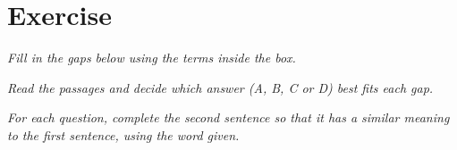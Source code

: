 \documentclass{article}
\begin{document}
\newpage
\section{Exercise}

\noindent \textit{Fill in the gaps below using the terms inside the box.}

%
%
%
%
%
%
%
%
%
%
%
%
%
%
%
%
%
%
%
%

\noindent \textit{Read the passages and decide which answer (A, B, C or D) best fits each gap.}

%
%
%
%
%
%
%
%
%
%
%
%
%
%
%
%
%
%
%
%

\noindent \textit{For each question, complete the second sentence so that it has a similar meaning to the first sentence, using the word given.}

%
%
%
%
%
%
%
%
%
%
%
%
%
%
%
%
%
%
%
%
\end{document}
